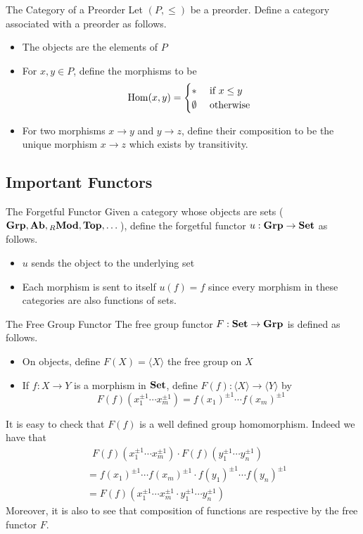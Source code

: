 \documentclass[a4paper]{article}
\begin{document}
\begin{defn}{The Category of a Preorder}{} Let $(P,\leq)$ be a preorder. Define a category associated with a preorder as follows. 
\begin{itemize}
\item The objects are the elements of $P$
\item For $x,y\in P$, define the morphisms to be $$\operatorname{Hom}(x,y)=\begin{cases}
\ast & \text{ if } x\leq y\\
\emptyset & \text{ otherwise }
\end{cases}$$
\item For two morphisms $x\to y$ and $y\to z$, define their composition to be the unique morphism $x\to z$ which exists by transitivity. 
\end{itemize}
\end{defn}

\subsection{Important Functors}
\begin{defn}{The Forgetful Functor}{} Given a category whose objects are sets ($\bold{Grp},\bold{Ab},{_R}\bold{Mod},\bold{Top},\dots$), define the forgetful functor $u:\bold{Grp}\to\bold{Set}$ as follows. 
\begin{itemize}
\item $u$ sends the object to the underlying set
\item Each morphism is sent to itself $u(f)=f$ since every morphism in these categories are also functions of sets. 
\end{itemize}
\end{defn}

\begin{defn}{The Free Group Functor}{} The free group functor $F:\bold{Set}\to\bold{Grp}$ is defined as follows. 
\begin{itemize}
\item On objects, define $F(X)=\langle X\rangle$ the free group on $X$
\item If $f:X\to Y$ is a morphism in $\bold{Set}$, define $F(f):\langle X\rangle\to\langle Y\rangle$ by $$F(f)(x_1^{\pm1}\cdots x_m^{\pm1})=f(x_1)^{\pm1}\cdots f(x_m)^{\pm1}$$
\end{itemize}
\end{defn}

It is easy to check that $F(f)$ is a well defined group homomorphism. Indeed we have that 
\begin{align*}
&\;\;F(f)(x_1^{\pm1}\cdots x_m^{\pm1})\cdot F(f)(y_1^{\pm1}\cdots y_n^{\pm1})\\
&=f(x_1)^{\pm1}\cdots f(x_m)^{\pm1}\cdot f(y_1)^{\pm1}\cdots f(y_n)^{\pm1}\\
&=F(f)(x_1^{\pm1}\cdots x_m^{\pm1}\cdot y_1^{\pm1}\cdots y_n^{\pm1})
\end{align*}
Moreover, it is also to see that composition of functions are respective by the free functor $F$. 
\end{document}
